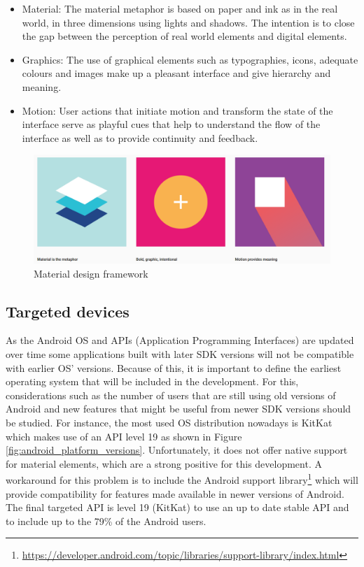 \begin{itemize}
    \item Material: The material metaphor is based on paper and ink as in the real world, in three dimensions using lights and shadows. The intention is to close the gap between the perception of real world elements and digital elements. 
    \item Graphics: The use of graphical elements such as typographies, icons, adequate colours and images make up a pleasant interface and give hierarchy and meaning. 
    \item Motion: User actions that initiate motion and transform the state of the interface serve as playful cues that help to understand the flow of the interface as well as to provide continuity and feedback. 
\end{itemize}


\begin{figure}[H]
\begin{adjustbox}{width=1\textwidth,center=\textwidth}
  \centering
  \includegraphics[scale=1]{images/material_google.png}
\end{adjustbox}
  \caption[Material design framework]{Material design framework \footnotemark}
  \label{fig:android_material_design}
\end{figure}

\subsection{Targeted devices}
As the Android OS and APIs (Application Programming Interfaces) are updated over time some applications built with later SDK versions will not be compatible with earlier OS' versions. Because of this, it is important to define the earliest operating system that will be included in the development. For this, considerations such as the number of users that are still using old versions of Android and new features that might be useful from newer SDK versions should be studied. For instance, the most used OS distribution nowadays is KitKat which makes use of an API level 19 as shown in Figure \ref{fig:android_platform_versions}.  Unfortunately, it does not offer native support for material elements, which are a strong positive for this development. A workaround for this problem is to include the Android support library\footnote{\url{https://developer.android.com/topic/libraries/support-library/index.html}} which will provide compatibility for features made available in newer versions of Android. The final targeted API is level 19 (KitKat) to use an up to date stable API and to include up to the 79\% of the Android users.  

